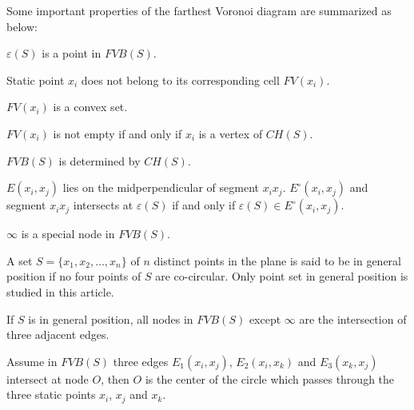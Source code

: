 \documentclass[final,3p,times]{elsarticle}
\begin{document}
Some important properties of the farthest Voronoi diagram are summarized as below:

\begin{Fact}
\label{fact_mec_center}
$\varepsilon(S)$ is a point in $FVB(S)$.
\end{Fact}

\begin{Fact}
\label{fact_outsidecell}
Static point $x_i$ does not belong to its corresponding cell $FV(x_i)$.
\end{Fact}

\begin{Fact}
\label{fact_cell_covex}
$FV(x_i)$ is a convex set.
\end{Fact}

\begin{Fact}
\label{fact_cell_not_empty}
$FV(x_i)$ is not empty if and only if $x_i$ is a vertex of $CH(S)$.
\end{Fact}

\begin{Fact}
\label{fact_fvbs_chs}
$FVB(S)$ is determined by $CH(S)$.
\end{Fact}

\begin{Fact}
\label{fact_midperpendicular}
$E(x_i,x_j)$ lies on the midperpendicular of segment $x_ix_j$. $E^\circ(x_i,x_j)$ and segment $x_ix_j$ intersects at $\varepsilon(S)$ if and only if $\varepsilon(S)\in E^\circ(x_i,x_j)$.
\end{Fact}

\begin{Fact}
\label{fact_infty}
$\infty$ is a special node in $FVB(S)$.
\end{Fact}

A set $S=\{x_1,x_2,...,x_n\}$ of $n$ distinct points in the plane is said to be in general position if no four points of $S$ are co-circular. Only point set in general position is studied in this article.
\begin{Fact}
\label{fact_general_position}
If $S$ is in general position, all nodes in $FVB(S)$ except $\infty$ are the intersection of three adjacent edges.
\end{Fact}
\begin{Fact}
\label{fact_adjointcircle}
Assume in $FVB(S)$ three edges $E_1(x_i,x_j)$, $E_2(x_i,x_k)$ and $E_3(x_k,x_j)$ intersect at node $O$, then $O$ is the center of the circle which passes through the three static points $x_i$, $x_j$ and $x_k$.
\end{Fact}
\end{document}
